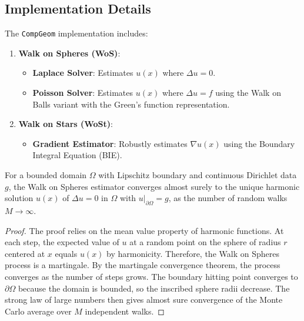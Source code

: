 \subsection{Implementation Details}
The \texttt{CompGeom} implementation includes:
\begin{enumerate}
  \item \textbf{Walk on Spheres (WoS)}:
  \begin{itemize}
    \item \textbf{Laplace Solver}: Estimates $u(x)$ where $\Delta u = 0$.
    \item \textbf{Poisson Solver}: Estimates $u(x)$ where $\Delta u = f$ using the Walk on Balls variant with the Green's function representation.
  \end{itemize}
  \item \textbf{Walk on Stars (WoSt)}:
  \begin{itemize}
    \item \textbf{Gradient Estimator}: Robustly estimates $\nabla u(x)$ using the Boundary Integral Equation (BIE).
  \end{itemize}
\end{enumerate}

\begin{theorem}\label{thm:wos_convergence}
For a bounded domain $\Omega$ with Lipschitz boundary and continuous Dirichlet data $g$, the Walk on Spheres estimator converges almost surely to the unique harmonic solution $u(x)$ of $\Delta u = 0$ in $\Omega$ with $u|_{\partial\Omega} = g$, as the number of random walks $M \to \infty$.
\end{theorem}
\begin{proof}
The proof relies on the mean value property of harmonic functions. At each step, the expected value of $u$ at a random point on the sphere of radius $r$ centered at $x$ equals $u(x)$ by harmonicity. Therefore, the Walk on Spheres process is a martingale. By the martingale convergence theorem, the process converges as the number of steps grows. The boundary hitting point converges to $\partial\Omega$ because the domain is bounded, so the inscribed sphere radii decrease. The strong law of large numbers then gives almost sure convergence of the Monte Carlo average over $M$ independent walks.
\end{proof}

